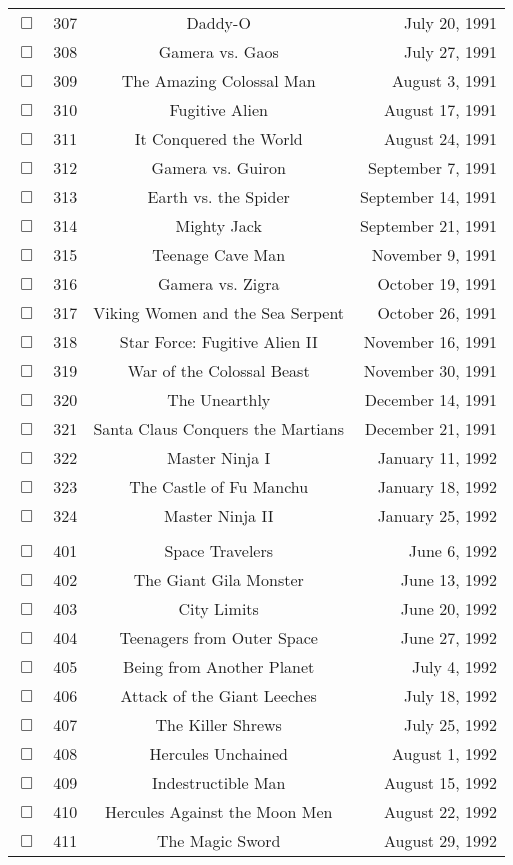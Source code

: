 \documentclass[12pt]{article}
\begin{document}
\begin{center}
\begin{longtable}[c]{cccr}
$\Box$&307&Daddy-O&July 20, 1991\\
$\Box$&308&Gamera vs. Gaos&July 27, 1991\\
$\Box$&309&The Amazing Colossal Man&August  3, 1991\\
$\Box$&310&Fugitive Alien&August 17, 1991\\
$\Box$&311&It Conquered the World&August 24, 1991\\
$\Box$&312&Gamera vs. Guiron&September  7, 1991\\
$\Box$&313&Earth vs. the Spider&September 14, 1991\\
$\Box$&314&Mighty Jack&September 21, 1991\\
$\Box$&315&Teenage Cave Man&November  9, 1991\\
$\Box$&316&Gamera vs. Zigra&October 19, 1991\\
$\Box$&317&Viking Women and the Sea Serpent&October 26, 1991\\
$\Box$&318&Star Force: Fugitive Alien II&November 16, 1991\\
$\Box$&319&War of the Colossal Beast&November 30, 1991\\
$\Box$&320&The Unearthly&December 14, 1991\\
$\Box$&321&Santa Claus Conquers the Martians&December 21, 1991\\
$\Box$&322&Master Ninja I&January 11, 1992\\
$\Box$&323&The Castle of Fu Manchu&January 18, 1992\\
$\Box$&324&Master Ninja II&January 25, 1992\\
\\
$\Box$&401&Space Travelers&June  6, 1992\\
$\Box$&402&The Giant Gila Monster&June 13, 1992\\
$\Box$&403&City Limits&June 20, 1992\\
$\Box$&404&Teenagers from Outer Space&June 27, 1992\\
$\Box$&405&Being from Another Planet&July  4, 1992\\
$\Box$&406&Attack of the Giant Leeches&July 18, 1992\\
$\Box$&407&The Killer Shrews&July 25, 1992\\
$\Box$&408&Hercules Unchained&August  1, 1992\\
$\Box$&409&Indestructible Man&August 15, 1992\\
$\Box$&410&Hercules Against the Moon Men&August 22, 1992\\
$\Box$&411&The Magic Sword&August 29, 1992\\

\end{longtable}
\end{center}
\end{document}
